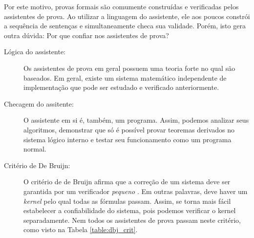 Por este motivo, provas formais são comumente construídas e verificadas pelos
assistentes de prova. Ao utilizar a linguagem do assistente, ele aos poucos
constrói a sequência de sentenças e simultaneamente checa sua validade. Porém,
isto gera outra dúvida: Por que confiar nos assistentes de prova?


\begin{description}
    \item[Lógica do assistente:] Os assistentes de prova em geral possuem uma
        teoria forte no qual são baseados. Em geral, existe um sistema
        matemático independente de implementação que pode ser estudado e
        verificado anteriormente.
    \item[Checagem do assitente:] O assistente em si é, também, um programa. Assim,
        podemos analizar seus algoritmos, demonstrar que só é possível provar
        teoremas derivados no sistema lógico interno e testar seu funcionamento
        como um programa normal.
    \item[Critério de De Bruijn:] O critério de de Bruijn afirma que a correção
        de um sistema deve ser garantida por um verificador \emph{pequeno}
        \cite{reek}. Em outras palavras, deve haver um \emph{kernel} pelo qual
        todas as fórmulas passam. Assim, se torna mais fácil estabelecer a
        confiabilidade do sistema, pois podemos verificar o kernel
        separadamente. Nem todos os assistentes de prova passam neste critério,
        como visto na Tabela \ref{table:dbj_crit}.
\end{description}

